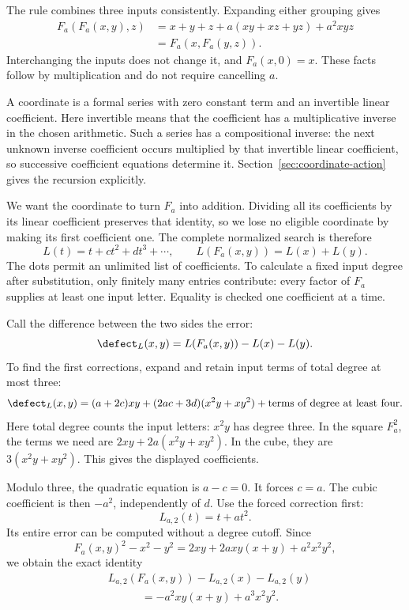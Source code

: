 The rule combines three inputs consistently. Expanding either grouping gives
\begin{align*}
 F_a(F_a(x,y),z)
 &=x+y+z+a(xy+xz+yz)+a^2xyz\\
 &=F_a(x,F_a(y,z)).
\end{align*}
Interchanging the inputs does not change it, and \(F_a(x,0)=x\). These facts follow by multiplication and do not require cancelling \(a\).

A coordinate is a formal series with zero constant term and an invertible linear coefficient. Here invertible means that the coefficient has a multiplicative inverse in the chosen arithmetic. Such a series has a compositional inverse: the next unknown inverse coefficient occurs multiplied by that invertible linear coefficient, so successive coefficient equations determine it. Section~\ref{sec:coordinate-action} gives the recursion explicitly.

We want the coordinate to turn \(F_a\) into addition. Dividing all its coefficients by its linear coefficient preserves that identity, so we lose no eligible coordinate by making its first coefficient one. The complete normalized search is therefore
\begin{equation}\label{eq:log-identity}
 L(t)=t+c t^2+d t^3+\cdots,
 \qquad L(F_a(x,y))=L(x)+L(y).
\end{equation}
The dots permit an unlimited list of coefficients. To calculate a fixed input degree after substitution, only finitely many entries contribute: every factor of \(F_a\) supplies at least one input letter. Equality is checked one coefficient at a time.

Call the difference between the two sides the error:
\[
 \defect_L(x,y)=L(F_a(x,y))-L(x)-L(y).
\]
To find the first corrections, expand and retain input terms of total degree at most three:
\begin{equation}\label{eq:first-coefficients}
 \defect_L(x,y)
 =(a+2c)xy+(2ac+3d)(x^2y+xy^2)
 +\text{terms of degree at least four}.
\end{equation}
Here total degree counts the input letters: \(x^2y\) has degree three. In the square \(F_a^2\), the terms we need are \(2xy+2a(x^2y+xy^2)\). In the cube, they are \(3(x^2y+xy^2)\). This gives the displayed coefficients.

Modulo three, the quadratic equation is \(a-c=0\). It forces \(c=a\). The cubic coefficient is then \(-a^2\), independently of \(d\). Use the forced correction first:
\[
 L_{a,2}(t)=t+at^2.
\]
Its entire error can be computed without a degree cutoff. Since
\[
 F_a(x,y)^2-x^2-y^2
 =2xy+2a xy(x+y)+a^2x^2y^2,
\]
we obtain the exact identity
\begin{equation}\label{eq:exact-char3-defect}
 \begin{split}
 &L_{a,2}(F_a(x,y))-L_{a,2}(x)-L_{a,2}(y)\\
 &\hspace{3em}=-a^2xy(x+y)+a^3x^2y^2.
 \end{split}
\end{equation}

